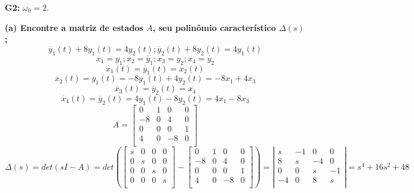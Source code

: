 \documentclass[11pt]{article}
\begin{document}
\textbf{G2: } $\omega_0 = 2$.

\textbf{(a) Encontre a matriz de estados $A$, seu polinômio característico $\Delta(s)$;}
\[\ddot{y_1}(t) + 8 y_1(t) = 4 y_2(t) ; \ddot{y_2}(t) + 8 y_2(t) = 4 y_1(t)\]
\[x_1 = y_1; x_2 = \dot{y_1}; x_3 = y_2; x_4 = \dot{y_2}\]
\[\dot{x_1}(t) = \dot{y_1}(t) = x_2(t)\]
\[\dot{x_2}(t) = \ddot{y_1}(t) = - 8 y_1(t) + 4 y_2(t) = - 8 x_1 + 4 x_3\]
\[\dot{x_3}(t) = \dot{y_2}(t) = x_4\]
\[\dot{x_4}(t) = \ddot{y_2}(t) = 4 y_1(t) - 8 y_2(t) = 4 x_1 - 8 x_3\]
\[A = \left[ {\begin{array}{cccc}
  0 & 1 & 0 & 0 \\
  -8 & 0 & 4 & 0 \\
  0 & 0 & 0 & 1 \\
  4 & 0 & -8 & 0 \\
\end{array} } \right]\]
\[
\Delta(s) = det(sI - A) = det\left(
\left[ {\begin{array}{cccc}
  s & 0 & 0 & 0 \\
  0 & s & 0 & 0 \\
  0 & 0 & s & 0 \\
  0 & 0 & 0 & s \\
\end{array} } \right]
-
\left[ {\begin{array}{cccc}
  0 & 1 & 0 & 0 \\
  -8 & 0 & 4 & 0 \\
  0 & 0 & 0 & 1 \\
  4 & 0 & -8 & 0 \\
  \end{array} } \right]
  \right)
  =
  \left| \begin{array}{cccc}
    s & -1  & 0 &  0\\ 
    8 & s & -4 & 0 \\
    0 & 0  & s & -1 \\
    -4 & 0  & 8 & s \\
  \end{array}
  \right|
  = s^4 + 16s^2 + 48
\]
\end{document}
